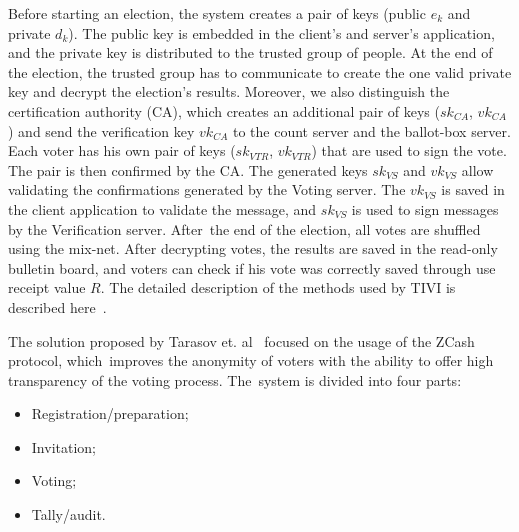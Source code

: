 \documentclass[applsci,article,accept,moreauthors,pdftex]{Definitions/mdpi}
\begin{document}
Before starting an election, the system creates a pair of keys (public $e_k$ and private $d_k$). The public key is embedded in the client's and server's application, and the private key is distributed to the trusted group of people. At the end of the election, the trusted group has to communicate to create the one valid private key and decrypt the election's results. 
Moreover, we also distinguish the certification authority (CA), which creates an additional pair of keys ($sk_{CA}$, $vk_{CA}$) and send the verification key $vk_{CA}$ to the count server and the ballot-box server. Each voter has his own pair of keys ($sk_{VTR}$, $vk_{VTR}$) that are used to sign the vote. The pair is then confirmed by the CA.
The generated keys $sk_{VS}$ and $vk_{VS}$ allow validating the confirmations generated by the Voting server. The $vk_{VS}$ is saved in the client application to validate the message, and $sk_{VS}$ is used to sign messages by the Verification server. After~the end of the election, all votes are shuffled using the mix-net. After decrypting votes, the results are saved in the {read-only bulletin board}, and voters can check if his vote was correctly saved through use receipt value $R$. The detailed description of the methods used by TIVI is described here~\cite{tivi:krips2018internet}.




The solution proposed by Tarasov et. al~\cite{tarasov2017future} focused on the usage of the ZCash protocol, which~improves the anonymity of voters with the ability to offer high transparency of the voting process. The~system is divided into four parts:\begin{itemize}
    \item Registration/preparation;
    \item Invitation;
    \item Voting;
    \item Tally/audit.
\end{itemize}
\end{document}

